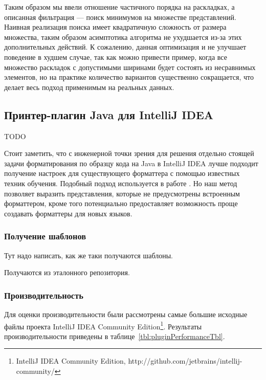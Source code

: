 Таким образом мы ввели отношение частичного порядка на раскладках, а
описанная фильтрация --- поиск минимумов на множестве представлений\cite{poset}.
Наивная реализация поиска имеет квадратичную сложность от размера множества,
таким образом асимптотика алгоритма не ухудшается из-за этих дополнительных
действий. К сожалению, данная оптимизация и не улучшает поведение
в худшем случае, так как
можно привести пример, когда все множество раскладок с допустимыми ширинами
будет состоять из несравнимых элементов, но на практике количество вариантов
существенно сокращается, что делает весь подход применимым на реальных данных.

\subsection{Принтер-плагин Java для IntelliJ IDEA}

TODO

Стоит заметить, что с инженерной точки зрения для решения отдельно стоящей задачи
форматирования по образцу кода на Java в IntelliJ IDEA лучше подходит
получение настроек для существующего форматтера с помощью известных техник обучения.
Подобный подход используется в работе \cite{learning}.
Но наш метод позволяет выразить представления, которые не предусмотрены
встроенным форматтером, кроме того потенциально предоставляет возможность проще
создавать форматтеры для новых языков. 

\subsubsection{Получение шаблонов}
Тут надо написать, как же таки получаются шаблоны.

Получаются из эталонного репозитория.

\subsubsection{Производительность}

Для оценки производительности были рассмотрены самые большие исходные файлы
проекта IntelliJ IDEA Community Edition\footnote{
IntelliJ IDEA Community Edition,
http://github.com/jetbrains/intellij-community/}.
Результаты производительности приведены в
таблице~\ref{tbl:pluginPerformanceTbl}.

